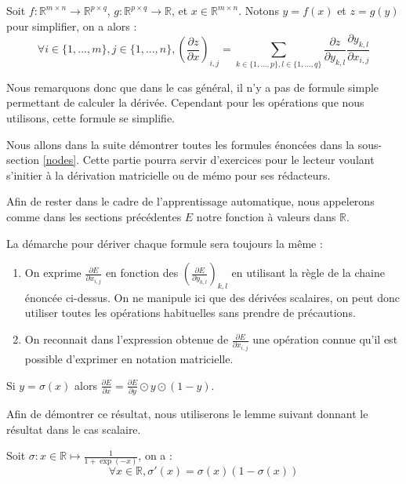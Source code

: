 \begin{proposition}
Soit $f : \mathbb{R}^{m \times n} \rightarrow \mathbb{R}^{p \times q}$, $g : \mathbb{R}^{p \times q} \rightarrow \mathbb{R}$, et $x \in \mathbb{R}^{m \times n}$. Notons $y = f(x)$ et $z = g(y)$ pour simplifier, on a alors :
$$
\forall i \in \{1, ..., m\}, j \in \{1, ..., n\}, (\frac{\partial z}{\partial x})_{i, j} = \sum_{k \in \{1, ..., p\}, l \in \{1, ..., q\}}{\frac{\partial z}{\partial y_{k, l}}\frac{\partial y_{k, l}}{\partial x_{i, j}}}
$$
\end{proposition}

Nous remarquons donc que dans le cas général, il n'y a pas de formule simple permettant de calculer la dérivée. Cependant pour les opérations que nous utilisons, cette formule se simplifie.

Nous allons dans la suite démontrer toutes les formules énoncées dans la sous-section \ref{nodes}. Cette partie pourra servir d'exercices pour le lecteur voulant s'initier à la dérivation matricielle ou de mémo pour ses rédacteurs.

Afin de rester dans le cadre de l'apprentissage automatique, nous appelerons comme dans les sections précédentes $E$ notre fonction à valeurs dans $\mathbb{R}$.

La démarche pour dériver chaque formule sera toujours la même :
\begin{enumerate}
\item On exprime $\frac{\partial E}{\partial x_{i, j}}$ en fonction des $(\frac{\partial E}{\partial y_{k, l}})_{k, l}$ en utilisant la règle de la chaine énoncée ci-dessus. On ne manipule ici que des dérivées scalaires, on peut donc utiliser toutes les opérations habituelles sans prendre de précautions.
\item On reconnait dans l'expression obtenue de $\frac{\partial E}{\partial x_{i, j}}$ une opération connue qu'il est possible d'exprimer en notation matricielle.
\end{enumerate}

\begin{proposition}
Si $y = \sigma(x)$ alors $\frac{\partial E}{\partial x} = \frac{\partial E}{\partial y} \odot y \odot (1 - y)$.
\label{derivative_sigmoid}
\end{proposition}

Afin de démontrer ce résultat, nous utiliserons le lemme suivant donnant le résultat dans le cas scalaire.

\begin{lemma}
Soit $\sigma : x \in \mathbb{R} \mapsto \frac{1}{1 + \exp(-x)}$, on a :
$$ 
\forall x \in \mathbb{R}, \sigma'(x) = \sigma(x)(1 - \sigma(x))
$$
\label{sigmoid_scalar}
\end{lemma}

